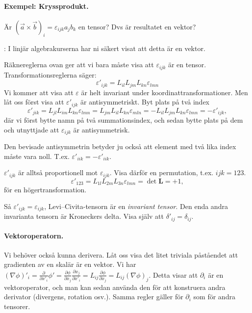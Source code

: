 \documentclass[%
oneside,                 %
final,                   %
10pt]{article}
\newcommand{\shortinlinecomment}[3]{{\color{red}{\bf #1}: #2}}
\begin{document}
\paragraph{Exempel: Kryssprodukt.}
Är $(\vec a\times\vec b)_i = \varepsilon_{ijk}a_jb_k$ en tensor? Dvs är resultatet en vektor? 

\shortinlinecomment{Comment 10}{ I linjär algebrakurserna har ni säkert visat att detta är en vektor. }{ I linjär algebrakurserna har }

Räknereglerna ovan ger att vi bara måste visa att $\varepsilon_{ijk}$ är en tensor. Transformationsreglerna säger:
\begin{equation}
\varepsilon'_{ijk}=L_{il}L_{jm}L_{kn}\varepsilon_{lmn}
\end{equation}
Vi kommer att visa att $\varepsilon$ är helt invariant under koordinattransformationer. Men låt oss först visa att $\varepsilon'_{ijk}$ är antisymmetriskt. Byt plats på två index
\begin{equation}
\varepsilon'_{jik}=L_{jl}L_{im}L_{kn}\varepsilon_{lmn} = L_{jm}L_{il}L_{kn}\varepsilon_{mln} = - L_{il} L_{jm}L_{kn}\varepsilon_{lmn} = - \varepsilon'_{ijk},
\end{equation}
där vi först bytte namn på två summationsindex, och sedan bytte plats på dem och utnyttjade att $\varepsilon_{ijk}$ är antisymmetrisk. 

Den bevisade antisymmetrin betyder ju också att element med två lika index måste vara noll. T.ex. $\varepsilon'_{iik} = -\varepsilon'_{iik}$.

$\varepsilon'_{ijk}$ är alltså proportionell mot $\varepsilon_{ijk}$. Visa därför en permutation, t.ex. $ijk=123$. 
\begin{equation}
\varepsilon'_{123}=L_{1l}L_{2m}L_{3n}\varepsilon_{lmn} = \det \mathbf{L} = +1,
\end{equation}
för en högertransformation.

Så $\varepsilon'_{ijk}=\varepsilon_{ijk}$, Levi--Civita-tensorn är en \emph{invariant tensor}. Den enda andra invarianta tensorn är Kroneckers delta. Visa själv att $\delta'_{ij}=\delta_{ij}$. 

\paragraph{Vektoroperatorn.}
Vi behöver också kunna derivera. Låt oss visa det litet triviala påståendet att gradienten
av en skalär är en vektor. Vi har $(\nabla\phi)'_i=\frac{\partial}{\partial x'_i}\phi'=\frac{\partial \phi}{\partial x_j} \frac{\partial x_j}{\partial x'_i}=
L_{ij} \frac{\partial \phi}{\partial x_j}=L_{ij}(\nabla\phi)_j$. Detta visar att $\partial _i$ är en vektoroperator, och man kan sedan använda den för att konstruera andra derivator (divergens, rotation osv.). Samma regler gäller för $\partial _i$ som för andra tensorer.
\end{document}
